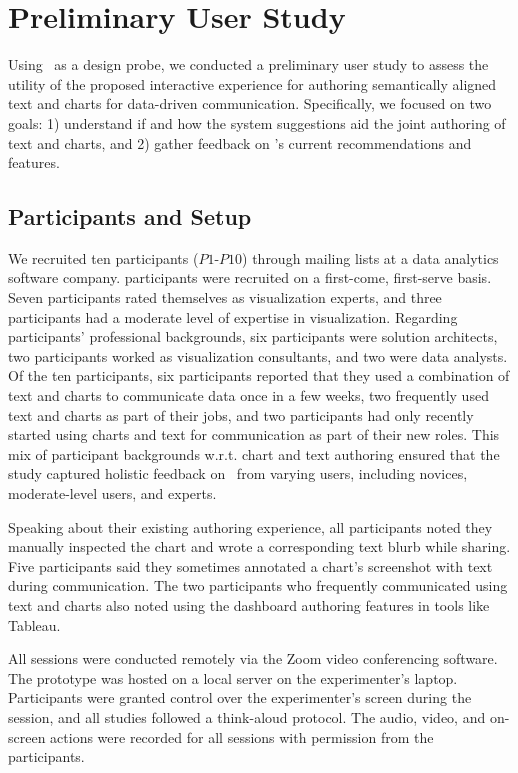 \section{Preliminary User Study}
\label{sec:study}

Using \pluto~as a design probe, we conducted a preliminary user study to assess the utility of the proposed interactive experience for authoring semantically aligned text and charts for data-driven communication.
Specifically, we focused on two goals: 1) understand if and how the system suggestions aid the joint authoring of text and charts, and 2) gather feedback on \pluto's current recommendations and features.

\subsection{Participants and Setup}

We recruited ten participants ($P1$-$P10$) through mailing lists at a data analytics software company.
 participants were recruited on a first-come, first-serve basis.
Seven participants rated themselves as visualization experts, and three participants had a moderate level of expertise in visualization. 
Regarding participants' professional backgrounds, six participants were solution architects, two participants worked as visualization consultants, and two were data analysts.
Of the ten participants, six participants reported that they used a combination of text and charts to communicate data once in a few weeks, two frequently used text and charts as part of their jobs, and two participants had only recently started using charts and text for communication as part of their new roles.
This mix of participant backgrounds w.r.t. chart and text authoring ensured that the study captured holistic feedback on \pluto~from varying users, including novices, moderate-level users, and experts.

Speaking about their existing authoring experience, all participants noted they manually inspected the chart and wrote a corresponding text blurb while sharing.
Five participants said they sometimes annotated a chart's screenshot with text during communication.
The two participants who frequently communicated using text and charts also noted using the dashboard authoring features in tools like Tableau.

All sessions were conducted remotely via the Zoom video conferencing software. The prototype was hosted on a local server on the experimenter's laptop. Participants were granted control over the experimenter's screen during the session, and all studies followed a think-aloud protocol. The audio, video, and on-screen actions were recorded for all sessions with permission from the participants.

